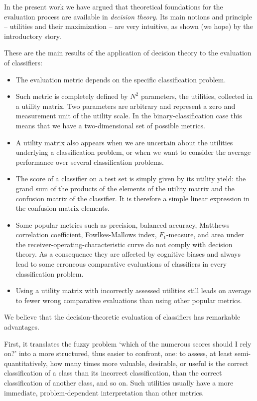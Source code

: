 \documentclass[\ifafour a4paper,12pt,\else a5paper,10pt,\fi%
onecolumn,oneside,article,%
british%
]{memoir}
\theoremstyle{remark}
\theoremstyle{innote}
\renewcommand*{\|}[1][]{\nonscript\:#1\vert\nonscript\:\mathopen{}}
\begin{document}
In the present work we have argued that theoretical foundations for the evaluation process are available in \emph{decision theory}. Its main notions and principle -- utilities and their maximization -- are very intuitive, as shown (we hope) by the introductory story.

These are the main results of the application of decision theory to the evaluation of classifiers:
\begin{itemize}[--,wide]
\item The evaluation metric depends on the specific classification problem.
\item Such metric is completely defined by $N^{2}$ parameters, the utilities, collected in a utility matrix. Two parameters are arbitrary and represent a zero and measurement unit of the utility scale. In the binary-classification case this means that we have a two-dimensional set of possible metrics.
\item A utility matrix also appears when we are uncertain about the utilities underlying a classification problem, or when we want to consider the average performance over several classification problems.
\item The score of a classifier on a test set is simply given by its utility yield: the grand sum of the products of the elements of the utility matrix and the confusion matrix of the classifier. It is therefore a simple linear expression in the confusion matrix elements.
\item Some popular metrics such as precision, balanced accuracy, Matthews correlation coefficient, Fowlkes-Mallows index, $F_{1}$-measure, and area under the receiver-operating-characteristic curve do not comply with decision theory. As a consequence they are affected by cognitive biases and always lead to some erroneous comparative evaluations of classifiers in every classification problem.
\item Using a utility matrix with incorrectly assessed utilities still leads on average to fewer wrong comparative evaluations than using other popular metrics.
\end{itemize}

We believe that the decision-theoretic evaluation of classifiers has remarkable advantages.

First, it translates the fuzzy problem \enquote*{which of the numerous scores should I rely on?} into a more structured, thus easier to confront, one: to assess, at least semi-quantitatively, how many times more valuable, desirable, or useful is the correct classification of a class than its incorrect classification, than the correct classification of another class, and so on. Such utilities usually have a more immediate, problem-dependent interpretation than other metrics.
\end{document}
